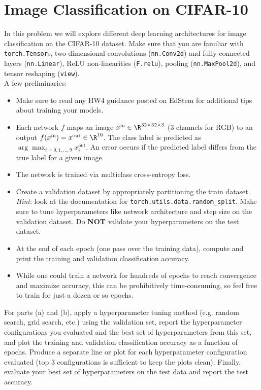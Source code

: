 \documentclass{article}
\begin{document}
\newpage
\section*{{Image Classification on CIFAR-10}}
\begin{aprob} In this problem we will explore different deep learning architectures for image classification on the CIFAR-10 dataset. Make sure that you are familiar with \texttt{torch.Tensor}s, two-dimensional convolutions (\texttt{nn.Conv2d}) and fully-connected layers (\texttt{nn.Linear}), ReLU non-linearities (\texttt{F.relu}), pooling (\texttt{nn.MaxPool2d}), and tensor reshaping (\texttt{view}). \\

A few preliminaries:
\begin{itemize}
  \item Make sure to read any HW4 guidance posted on EdStem for additional tips about training your models.
  \item Each network $f$ maps an image $x^\text{in} \in \R^{32 \times 32 \times 3}$ (3 channels for RGB) to an output $f(x^\text{in}) = x^\text{out} \in \R^{10}$. The class label is predicted as $\arg\max_{i=0,1,\dots,9} x_{i}^\text{out}$. An error occurs if the predicted label differs from the true label for a given image. 
  \item The network is trained via multiclass cross-entropy loss. 
 
  \item Create a validation dataset by appropriately partitioning the train dataset. \emph{Hint}: look at the documentation for \texttt{torch.utils.data.random\_split}. Make sure to tune hyperparameters like network architecture and step size on the validation dataset. Do \textbf{NOT} validate your hyperparameters on the test dataset.
  \item At the end of each epoch (one pass over the training data), compute and print the training and validation classification accuracy.
  \item While one could train a network for hundreds of epochs to reach convergence and maximize accuracy, this can be prohibitively time-consuming, so feel free to train for just a dozen or so epochs. 
\end{itemize}

For parts (a) and (b), apply a hyperparameter tuning method (e.g. random search, grid search, etc.) using the validation set, report the hyperparameter configurations you evaluated and the best set of hyperparameters from this set, and plot the training and validation classification accuracy as a function of epochs. Produce a separate line or plot for each hyperparameter configuration evaluated (top 3 configurations is sufficient to keep the plots clean). Finally, evaluate your best set of hyperparameters on the test data and report the test accuracy. 


\end{aprob}
\end{document}
